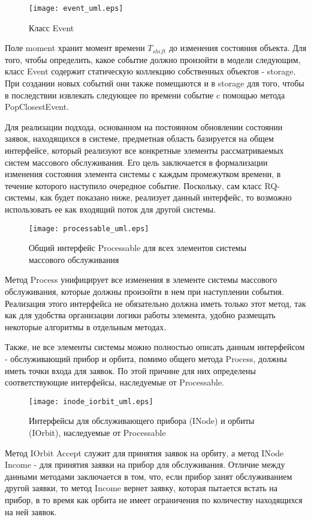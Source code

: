 \begin{figure}[H]
	\centering
	\texttt{[image: event\_uml.eps]}
	\caption{Класс Event}
	\label{event_uml}
\end{figure}
Поле moment хранит момент времени $T_{shift}$ до изменения состояния объекта. Для того, чтобы определить, какое событие должно произойти в модели следующим, класс Event содержит статическую коллекцию собственных объектов - storage. При создании новых событий они также помещаются и в storage для того, чтобы в последствии извлекать следующее по времени событие c помощью метода PopClosestEvent.

Для реализации подхода, основанном на постоянном обновлении состоянии заявок, находящихся в системе, предметная область базируется на общем интерфейсе, который реализуют все конкретные элементы рассматриваемых систем массового обслуживания. Его цель заключается в формализации изменения состояния элемента системы с каждым промежутком времени, в течение которого наступило очередное событие. Поскольку, сам класс RQ-системы, как будет показано ниже, реализует данный интерфейс, то возможно использовать ее как входящий поток для другой системы.
\begin{figure}[H]
	\centering
	\texttt{[image: processable\_uml.eps]}
	\caption{Общий интерфейс Processable для всех элементов системы массового обслуживания}
	\label{processable_uml}
\end{figure}
Метод Process унифицирует все изменения в элементе системы массового обслуживания, которые должны произойти в нем при наступлении события. Реализация этого интерфейса не обязательно должна иметь только этот метод, так как для удобства организации логики работы элемента, удобно размещать некоторые алгоритмы в отдельным методах.

Также, не все элементы системы можно полностью описать данным интерфейсом - обслуживающий прибор и орбита, помимо общего метода Process, должны иметь точки входа для заявок. По этой причине для них определены соответствующие интерфейсы, наследуемые от Processable.
\begin{figure}[H]
	\centering
	\texttt{[image: inode\_iorbit\_uml.eps]}
	\caption{Интерфейсы для обслуживающего прибора (INode) и орбиты (IOrbit), наследуемые от Processable}
	\label{inode_iorbit_uml}
\end{figure}
Метод IOrbit Accept служит для принятия заявок на орбиту, а метод INode Income - для принятия заявки на прибор для обслуживания. Отличие между данными методами заключается в том, что, если прибор занят обслуживанием другой заявки, то метод Income вернет заявку, которая пытается встать на прибор, в то время как орбита не имеет ограничения по количеству находящихся на ней заявок.

